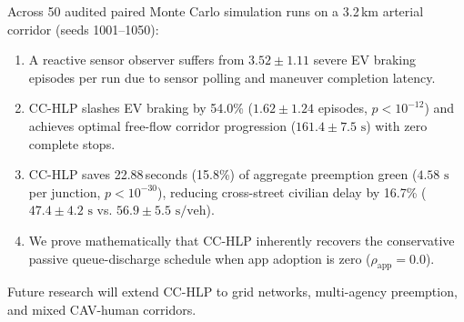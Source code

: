 \documentclass[journal,10pt,twocolumn]{IEEEtran}
\begin{document}
Across 50 audited paired Monte Carlo simulation runs on a 3.2\,km arterial corridor (seeds 1001--1050):
\begin{enumerate}
    \item A reactive sensor observer suffers from $3.52 \pm 1.11$ severe EV braking episodes per run due to sensor polling and maneuver completion latency.
    \item CC-HLP slashes EV braking by 54.0\% ($1.62 \pm 1.24$ episodes, $p < 10^{-12}$) and achieves optimal free-flow corridor progression ($161.4 \pm 7.5\text{ s}$) with zero complete stops.
    \item CC-HLP saves 22.88\,seconds (15.8\%) of aggregate preemption green ($4.58\text{ s}$ per junction, $p < 10^{-30}$), reducing cross-street civilian delay by 16.7\% ($47.4 \pm 4.2\text{ s}$ vs. $56.9 \pm 5.5\text{ s/veh}$).
    \item We prove mathematically that CC-HLP inherently recovers the conservative passive queue-discharge schedule when app adoption is zero ($\rho_{\text{app}} = 0.0$).
\end{enumerate}

Future research will extend CC-HLP to grid networks, multi-agency preemption, and mixed CAV-human corridors.
\end{document}
